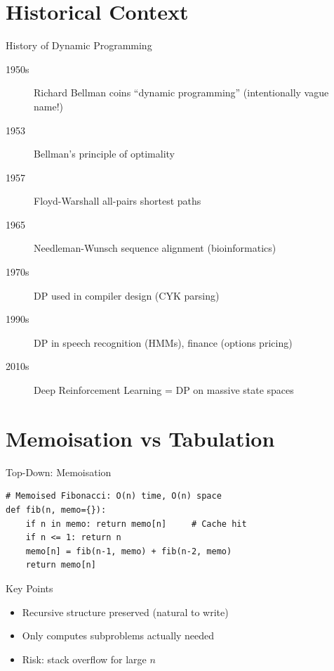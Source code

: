 \documentclass[aspectratio=169,xcolor=dvipsnames]{beamer}
\begin{document}
\section{Historical Context}
\begin{frame}{History of Dynamic Programming}
  \begin{description}
    \item[1950s] Richard Bellman coins ``dynamic programming'' (intentionally vague name!)
    \item[1953] Bellman's principle of optimality
    \item[1957] Floyd-Warshall all-pairs shortest paths
    \item[1965] Needleman-Wunsch sequence alignment (bioinformatics)
    \item[1970s] DP used in compiler design (CYK parsing)
    \item[1990s] DP in speech recognition (HMMs), finance (options pricing)
    \item[2010s] Deep Reinforcement Learning = DP on massive state spaces
  \end{description}
\end{frame}

\section{Memoisation vs Tabulation}
\begin{frame}[fragile]{Top-Down: Memoisation}
  \begin{lstlisting}
# Memoised Fibonacci: O(n) time, O(n) space
def fib(n, memo={}):
    if n in memo: return memo[n]     # Cache hit
    if n <= 1: return n
    memo[n] = fib(n-1, memo) + fib(n-2, memo)
    return memo[n]
  \end{lstlisting}
  \begin{block}{Key Points}
    \begin{itemize}
      \item Recursive structure preserved (natural to write)
      \item Only computes subproblems actually needed
      \item Risk: stack overflow for large $n$
    \end{itemize}
  \end{block}
\end{frame}
\end{document}
